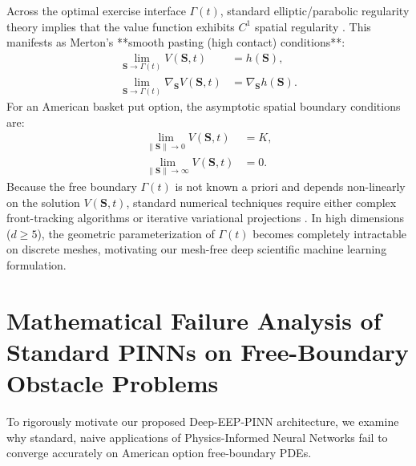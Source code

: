 \documentclass[11pt,a4paper]{article}
\begin{document}
Across the optimal exercise interface $\Gamma(t)$, standard elliptic/parabolic regularity theory implies that the value function exhibits $C^1$ spatial regularity \cite{merton1973theory, kim1990analytic}. This manifests as Merton's **smooth pasting (high contact) conditions**:
\begin{align}
\label{eq:smooth_pasting_value}
\lim_{\mathbf{S} \to \Gamma(t)} V(\mathbf{S}, t) &= h(\mathbf{S}), \\
\label{eq:smooth_pasting_gradient}
\lim_{\mathbf{S} \to \Gamma(t)} \nabla_{\mathbf{S}} V(\mathbf{S}, t) &= \nabla_{\mathbf{S}} h(\mathbf{S}).
\end{align}
For an American basket put option, the asymptotic spatial boundary conditions are:
\begin{align}
\label{eq:bc_zero}
\lim_{\|\mathbf{S}\| \to 0} V(\mathbf{S}, t) &= K, \\
\label{eq:bc_infinity}
\lim_{\|\mathbf{S}\| \to \infty} V(\mathbf{S}, t) &= 0.
\end{align}
Because the free boundary $\Gamma(t)$ is not known a priori and depends non-linearly on the solution $V(\mathbf{S}, t)$, standard numerical techniques require either complex front-tracking algorithms or iterative variational projections \cite{cryer1971solution, forsyth2002quadratic}. In high dimensions ($d \ge 5$), the geometric parameterization of $\Gamma(t)$ becomes completely intractable on discrete meshes, motivating our mesh-free deep scientific machine learning formulation.

\section{Mathematical Failure Analysis of Standard PINNs on Free-Boundary Obstacle Problems}

To rigorously motivate our proposed Deep-EEP-PINN architecture, we examine why standard, naive applications of Physics-Informed Neural Networks \cite{al2018solving, larios2021neural, he2022dual} fail to converge accurately on American option free-boundary PDEs.
\end{document}
